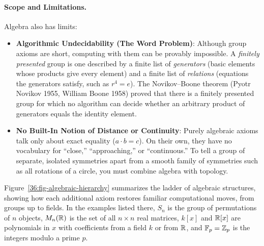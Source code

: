\paragraph{Scope and Limitations.}
Algebra also has limits:
\begin{itemize}
  \item \textbf{Algorithmic Undecidability (The Word Problem)}: Although group axioms are short, computing with them can be provably impossible. A \emph{finitely presented} group is one described by a finite list of \emph{generators} (basic elements whose products give every element) and a finite list of \emph{relations} (equations the generators satisfy, such as $r^4 = e$). The Novikov--Boone theorem (Pyotr Novikov 1955, William Boone 1958) proved that there is a finitely presented group for which no algorithm can decide whether an arbitrary product of generators equals the identity element.
  \item \textbf{No Built-In Notion of Distance or Continuity}: Purely algebraic axioms talk only about exact equality ($a \cdot b = c$). On their own, they have no vocabulary for ``close,'' ``approaching,'' or ``continuous.'' To tell a group of separate, isolated symmetries apart from a smooth family of symmetries such as all rotations of a circle, you must combine algebra with topology.
\end{itemize}

Figure~\ref{36:fig-algebraic-hierarchy} summarizes the ladder of algebraic structures, showing how each additional axiom restores familiar computational moves, from groups up to fields. In the examples listed there, $S_n$ is the group of permutations of $n$ objects, $M_n(\mathbb{R})$ is the set of all $n \times n$ real matrices, $k[x]$ and $\mathbb{R}[x]$ are polynomials in $x$ with coefficients from a field $k$ or from $\mathbb{R}$, and $\mathbb{F}_p = \mathbb{Z}_p$ is the integers modulo a prime $p$.

